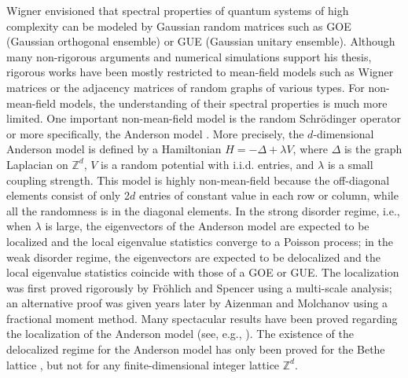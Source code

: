 \documentclass{article}
\newcommand{\1}{\mathds{1}}
\numberwithin{equation}{section}
\renewcommand{\geq}{\geqslant}
\renewcommand{\ge}{\geq}
\newcommand{\Z}{\mathbb{Z}}
\theoremstyle{plain} %
\theoremstyle{remark}
\newcommand{\nc}{\normalcolor}
\begin{document}


Wigner envisioned \cite{Wigner} that spectral properties of quantum systems of high complexity can be modeled by Gaussian random matrices such as GOE (Gaussian orthogonal ensemble) or GUE (Gaussian unitary ensemble). Although many non-rigorous arguments and numerical simulations support his thesis, rigorous works have been mostly restricted to mean-field models such as Wigner matrices or the adjacency matrices of random graphs of various types. For non-mean-field models, the understanding of their spectral properties is much more limited. One important non-mean-field model is the random Schr{\"o}dinger operator or more specifically, the Anderson model \cite{Anderson}. More precisely, the $d$-dimensional Anderson model is defined  by a Hamiltonian $H=-\Delta + \lambda V$, where $\Delta$ is the graph Laplacian on $\Z^d$, $V$ is a random potential with i.i.d. entries, and $\lambda$ is a small coupling strength. This model is highly non-mean-field because the off-diagonal elements consist of only 2$d$ entries of constant value in each row or column, while all the randomness is in the diagonal elements. In the strong disorder regime, i.e., when $\lambda $ is large, the eigenvectors of the Anderson model are expected to be localized and the local eigenvalue statistics converge to a Poisson process;  in the weak disorder regime, the eigenvectors are expected to be delocalized and the local eigenvalue statistics coincide with those of a GOE or GUE. 
The localization was first proved rigorously by Fr{\"o}hlich and Spencer \cite{FroSpen_1983} using a multi-scale analysis;   an alternative  proof was given years  later by Aizenman and Molchanov \cite{Aizenman1993} using a fractional moment method. Many spectacular results have been proved regarding the localization of the Anderson model (see, e.g., \cite{FroSpen_1985,Bourgain2005,Carmona1987,DingSmart2020,Damanik2002,Germinet2013,LiZhang2019}). The existence of the delocalized regime for the Anderson model has only been proved for the Bethe lattice \cite{Bethe_PRL,Bethe_JEMS}, but not for any finite-dimensional integer lattice $\Z^d$.
\end{document}
